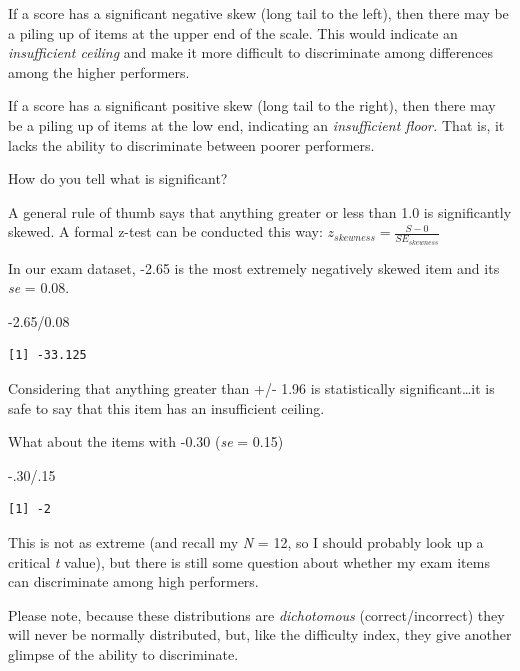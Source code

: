 \documentclass[
  english,
]{book}
\newenvironment{Shaded}{\begin{snugshade}}{\end{snugshade}}
\newcommand{\DecValTok}[1]{\textcolor[rgb]{0.00,0.00,0.81}{#1}}
\newcommand{\FloatTok}[1]{\textcolor[rgb]{0.00,0.00,0.81}{#1}}
\newcommand{\NormalTok}[1]{#1}
\newcommand{\SpecialCharTok}[1]{\textcolor[rgb]{0.00,0.00,0.00}{#1}}
\begin{document}
If a score has a significant negative skew (long tail to the left), then there may be a piling up of items at the upper end of the scale. This would indicate an \emph{insufficient ceiling} and make it more difficult to discriminate among differences among the higher performers.

If a score has a significant positive skew (long tail to the right), then there may be a piling up of items at the low end, indicating an \emph{insufficient floor.} That is, it lacks the ability to discriminate between poorer performers.

How do you tell what is significant?

A general rule of thumb says that anything greater or less than 1.0 is significantly skewed. A formal z-test can be conducted this way: \(z_{skewness}= \frac{S-0}{SE_{skewness}}\)

In our exam dataset, -2.65 is the most extremely negatively skewed item and its \emph{se} = 0.08.

\begin{Shaded}
\begin{Highlighting}[]
\SpecialCharTok{{-}}\FloatTok{2.65}\SpecialCharTok{/}\FloatTok{0.08}
\end{Highlighting}
\end{Shaded}

\begin{verbatim}
[1] -33.125
\end{verbatim}

Considering that anything greater than +/- 1.96 is statistically significant\ldots it is safe to say that this item has an insufficient ceiling.

What about the items with -0.30 (\emph{se} = 0.15)

\begin{Shaded}
\begin{Highlighting}[]
\SpecialCharTok{{-}}\NormalTok{.}\DecValTok{30}\SpecialCharTok{/}\NormalTok{.}\DecValTok{15}
\end{Highlighting}
\end{Shaded}

\begin{verbatim}
[1] -2
\end{verbatim}

This is not as extreme (and recall my \emph{N} = 12, so I should probably look up a critical \emph{t} value), but there is still some question about whether my exam items can discriminate among high performers.

Please note, because these distributions are \emph{dichotomous} (correct/incorrect) they will never be normally distributed, but, like the difficulty index, they give another glimpse of the ability to discriminate.
\end{document}
